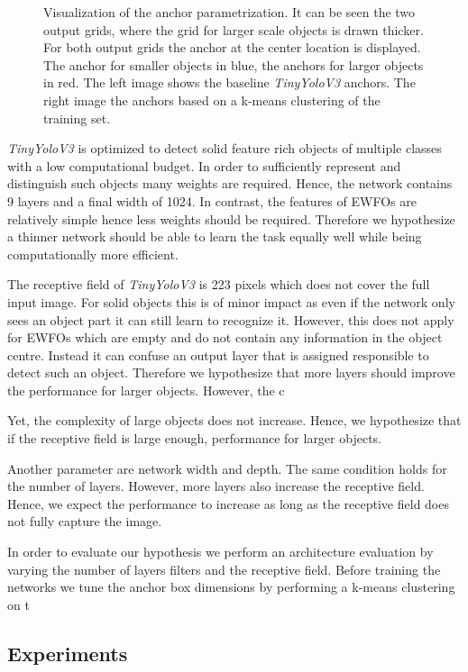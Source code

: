 \begin{figure}[hbtp]
\begin{minipage}{0.3\textwidth}
	\end{minipage}
	\caption{ Visualization of the anchor parametrization. It can be seen the two output grids, where the grid for larger scale objects is drawn thicker. For both output grids the anchor at the center location is displayed. The anchor for smaller objects in blue, the anchors for larger objects in red. The left image shows the baseline \textit{TinyYoloV3} anchors. The right image the anchors based on a k-means clustering of the training set. }
	\label{fig:anchors}
\end{figure}

\textit{TinyYoloV3} is optimized to detect solid feature rich objects of multiple classes with a low computational budget. In order to sufficiently represent and distinguish such objects many weights are required. Hence, the network contains 9 layers and a final width of 1024. In contrast, the features of \acp{EWFO} are relatively simple hence less weights should be required. Therefore we hypothesize a thinner network should be able to learn the task equally well while being computationally more efficient.

The receptive field of \textit{TinyYoloV3} is 223 pixels which does not cover the full input image. For solid objects this is of minor impact as even if the network only sees an object part it can still learn to recognize it. However, this does not apply for \acp{EWFO} which are empty and do not contain any information in the object centre. Instead it can confuse an output layer that is assigned responsible to detect such an object. Therefore we hypothesize that more layers should improve the performance for larger objects. However, the c 

Yet, the complexity of large objects does not increase. Hence, we hypothesize that if the receptive field is large enough,  performance for larger objects. 

Another parameter are network width and depth.  The same condition holds for the number of layers. However, more layers also increase the receptive field. Hence, we expect the performance to increase as long as the receptive field does not fully capture the image.

In order to evaluate our hypothesis we perform an architecture evaluation by varying the number of layers filters and the receptive field. Before training the networks we tune the anchor box dimensions by performing a k-means clustering on t



\subsection{Experiments}

